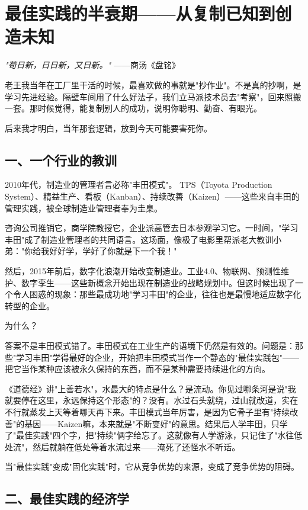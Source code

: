 \chapter{最佳实践的半衰期——从复制已知到创造未知}


\textit{"苟日新，日日新，又日新。"}
——商汤《盘铭》


老王我当年在工厂里干活的时候，最喜欢做的事就是"抄作业"。不是真的抄啊，是学习先进经验。隔壁车间用了什么好法子，我们立马派技术员去"考察"，回来照搬一套。那时候觉得，能复制别人的成功，说明你聪明、勤奋、有眼光。

后来我才明白，当年那套逻辑，放到今天可能要害死你。

\section{一、一个行业的教训}


2010年代，制造业的管理者言必称"丰田模式"。 TPS（Toyota Production System）、精益生产、看板（Kanban）、持续改善（Kaizen）——这些来自丰田的管理实践，被全球制造业管理者奉为圭臬。

咨询公司推销它，商学院教授它，企业派高管去日本参观学习它。一时间，"学习丰田"成了制造业管理者的共同语言。这场面，像极了电影里帮派老大教训小弟："你给我好好学，学好了你就是下一个我！"

然后，2015年前后，数字化浪潮开始改变制造业。工业4.0、物联网、预测性维护、数字孪生——这些新概念开始出现在制造业的战略规划中。但这时候出现了一个令人困惑的现象：那些最成功地"学习丰田"的企业，往往也是最慢地适应数字化转型的企业。

为什么？

答案不是丰田模式错了。丰田模式在工业生产的语境下仍然是有效的。问题是：那些"学习丰田"学得最好的企业，开始把丰田模式当作一个静态的"最佳实践包"——把它当作某种应该被永久保持的东西，而不是某种需要持续进化的方向。

《道德经》讲"上善若水"，水最大的特点是什么？是流动。你见过哪条河是说"我就要停在这里，永远保持这个形态"的？没有。水过石头就绕，过山就改道，实在不行就蒸发上天等着哪天再下来。丰田模式当年厉害，是因为它骨子里有"持续改善"的基因——Kaizen嘛，本来就是"不断变好"的意思。结果后人学丰田，只学了"最佳实践"四个字，把"持续"俩字给忘了。这就像有人学游泳，只记住了"水往低处流"，然后就躺在低处等着水流过来——淹死了还怪水不听话。

当"最佳实践"变成"固化实践"时，它从竞争优势的来源，变成了竞争优势的阻碍。

\section{二、最佳实践的经济学}


